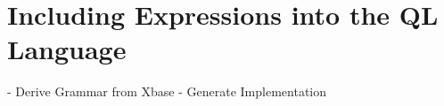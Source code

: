\section{Including Expressions into the QL Language}

- Derive Grammar from Xbase
- Generate Implementation

